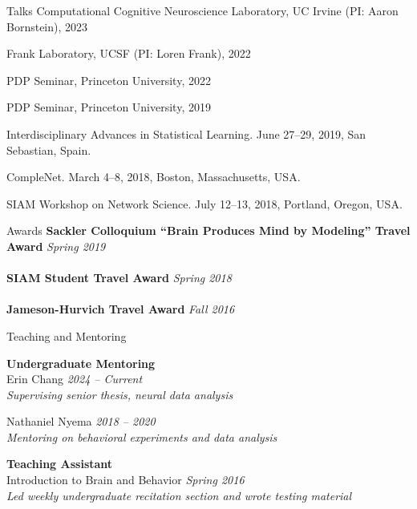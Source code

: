\documentclass{resume} %
\begin{document}
\begin{rSection}{Talks}
Computational Cognitive Neuroscience Laboratory, UC Irvine (PI: Aaron Bornstein), 2023

Frank Laboratory, UCSF (PI: Loren Frank), 2022

PDP Seminar, Princeton University, 2022

PDP Seminar, Princeton University, 2019

Interdisciplinary Advances in Statistical Learning. June 27--29, 2019, San Sebastian, Spain.

CompleNet. March 4--8, 2018, Boston, Massachusetts, USA.

SIAM Workshop on Network Science. July 12--13, 2018, Portland, Oregon, USA.
\end{rSection}

\begin{rSection}{Awards}
    \textbf{Sackler Colloquium ``Brain Produces Mind by Modeling'' Travel Award} \hfill \emph{Spring 2019} \\
    \\
    \textbf{SIAM Student Travel Award} \hfill \emph{Spring 2018} \\
    \\
    \textbf{Jameson-Hurvich Travel Award} \hfill \emph{Fall 2016} \\
\end{rSection}


\begin{rSection}{Teaching and Mentoring}

\textbf{Undergraduate Mentoring} \\
Erin Chang \hfill \emph{2024 -- Current} \\
\emph{Supervising senior thesis, neural data analysis}

Nathaniel Nyema \hfill \emph{2018 -- 2020} \\
\emph{Mentoring on behavioral experiments and data analysis}

\textbf{Teaching Assistant} \\
Introduction to Brain and Behavior \hfill \emph{Spring 2016} \\
\emph{Led weekly undergraduate recitation section and wrote testing material}

\end{rSection}
\end{document}
